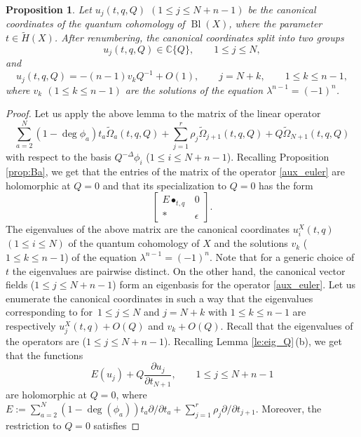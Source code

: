 \documentclass[10pt,a4paper]{article}
\numberwithin{equation}{section}
\newtheorem{Proposition}[Theorem]{Proposition}
\newcommand{\CC}{\mathbb{C}}
\begin{document}
\begin{Proposition}\label{prop:can-Q_exp}
Let $u_j(t,q,Q)$ $(1\leq j\leq N+n-1)$ be the canonical coordinates of the quantum cohomology of $\operatorname{Bl}(X)$, where the parameter $t\in \widetilde{H}(X)$. After renumbering, the canonical coordinates split into two groups
\[
u_j(t,q,Q)\in \CC\{Q\},\qquad 1\leq j\leq N,
\]
and
\[
u_j(t,q,Q)=-(n-1)v_k Q^{-1}+O(1),\qquad j=N+k,\qquad 1\leq k\leq n-1,
\]
where $v_k$ $(1\leq k\leq n-1)$ are the solutions of the equation $\lambda^{n-1}=(-1)^n$.
\end{Proposition}
\begin{proof}
Let us apply the above lemma to the matrix of the linear operator
\begin{equation}\label{aux_euler}
\sum_{a=2}^N (1-\operatorname{deg}\phi_a)
t_a \widetilde{\Omega}_a(t,q,Q) +
\sum_{j=1}^r \rho_j \widetilde{\Omega}_{j+1}(t,q,Q)+
Q\widetilde{\Omega}_{N+1}(t,q,Q)
\end{equation}
with respect to the basis $Q^{-\Delta }\phi_i$ ($1\leq i\leq N+n-1$). Recalling Proposition \ref{prop:Ba}, we get that the entries of the matrix of the operator \eqref{aux_euler} are holomorphic at $Q=0$ and that its specialization to $Q=0$ has the form
\[
\begin{bmatrix}
E\bullet_{t,q} & 0 \\
* & \epsilon
\end{bmatrix}.
\]
The eigenvalues of the above matrix are the canonical coordinates $u_i^X(t,q)$ $(1\leq i\leq N)$ of the quantum cohomology of $X$ and the solutions $v_k$ ($1\leq k\leq n-1$) of the equation $\lambda^{n-1}=(-1)^n$. Note that for a generic choice of $t$ the eigenvalues are pairwise distinct. On the other hand, the canonical vector fields  ($1\leq j\leq N+n-1$) form an eigenbasis for the operator \eqref{aux_euler}. Let us enumerate the canonical coordinates in such a way that the eigenvalues corresponding to  for~$1\leq j\leq N$ and $j=N+k$ with $1\leq k\leq n-1$ are respectively $u_j^X(t,q)+O(Q)$ and $v_k+O(Q)$. Recall that the eigenvalues of the operators  are  ($1\leq j\leq N+n-1$). Recalling Lemma \ref{le:eig_Q}\,(b), we get that the functions
\[
E(u_j) + Q\frac{\partial u_j}{\partial t_{N+1}}, \qquad 1\leq j\leq N+n-1
\]
are holomorphic at $Q=0$, where
$E:=
\sum_{a=2}^N (1-\operatorname{deg}(\phi_a)) t_a \partial/\partial {t_a} +
\sum_{j=1}^r \rho_j \partial/\partial t_{j+1}$. Moreover, the restriction to $Q=0$ satisfies

\end{proof}
\end{document}
